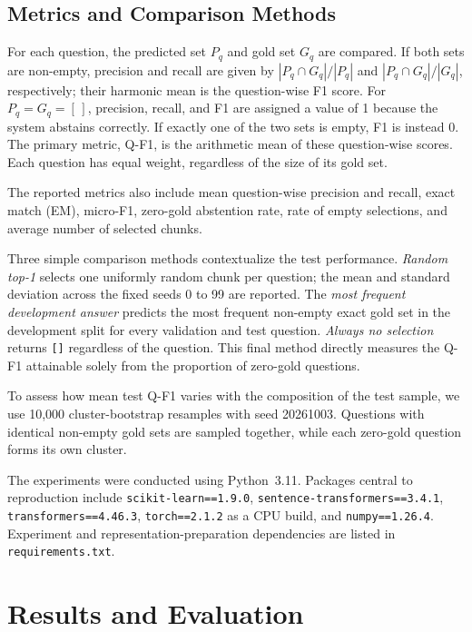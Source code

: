 \documentclass[11pt]{article}
\begin{document}
\subsection{Metrics and Comparison Methods}

For each question, the predicted set $P_q$ and gold set $G_q$ are compared. If both sets are non-empty, precision and recall are given by $|P_q\cap G_q|/|P_q|$ and $|P_q\cap G_q|/|G_q|$, respectively; their harmonic mean is the question-wise F1 score. For $P_q=G_q=[\,]$, precision, recall, and F1 are assigned a value of 1 because the system abstains correctly. If exactly one of the two sets is empty, F1 is instead 0. The primary metric, Q-F1, is the arithmetic mean of these question-wise scores. Each question has equal weight, regardless of the size of its gold set.

The reported metrics also include mean question-wise precision and recall, exact match (EM), micro-F1, zero-gold abstention rate, rate of empty selections, and average number of selected chunks.

Three simple comparison methods contextualize the test performance. \emph{Random top-1} selects one uniformly random chunk per question; the mean and standard deviation across the fixed seeds 0 to 99 are reported. The \emph{most frequent development answer} predicts the most frequent non-empty exact gold set in the development split for every validation and test question. \emph{Always no selection} returns \texttt{[]} regardless of the question. This final method directly measures the Q-F1 attainable solely from the proportion of zero-gold questions.

To assess how mean test Q-F1 varies with the composition of the test sample, we use 10,000 cluster-bootstrap resamples with seed 20261003. Questions with identical non-empty gold sets are sampled together, while each zero-gold question forms its own cluster.

The experiments were conducted using Python~3.11. Packages central to reproduction include \texttt{scikit-learn==1.9.0}, \texttt{sentence-transformers==3.4.1}, \texttt{transformers==4.46.3}, \texttt{torch==2.1.2} as a CPU build, and \texttt{numpy==1.26.4}. Experiment and representation-preparation dependencies are listed in \texttt{requirements.txt}.

\section{Results and Evaluation}
\end{document}
